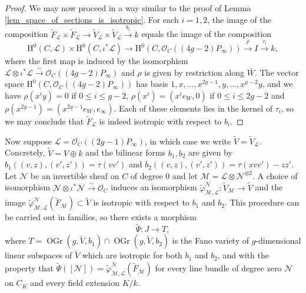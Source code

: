\documentclass{article} %
\numberwithin{equation}{section}
\newcommand{\sh}[1]{\mathscr{#1}}
\renewcommand{\O}{\mathcal{O}}
\newcommand{\HH}{\mathrm{H}}
\DeclareMathOperator{\OGr}{OGr}
\begin{document}
\begin{proof}
    We may now proceed in a way similar to the proof of Lemma \ref{lem_space_of_sections_is_isotropic}.
    For each $i=1,2$, the image of the composition $\tilde{F}_{\sh{L}} \times \tilde{F}_{\sh{L}} \rightarrow \tilde{V}_{\sh{L}} \times \tilde{V}_{\sh{L}} \xrightarrow{b_i} k$ equals the image of the composition 
    \[
    \HH^0(C, \sh{L}) \times \HH^0(C, \iota^*\sh{L}) \rightarrow
    \HH^0(C, \O_C((4g-2)P_{\infty})) \xrightarrow{\rho} I \xrightarrow{\tau_i} k,
    \]
    where the first map is induced by the isomorphism $\sh{L} \otimes \iota^*\sh{L} \xrightarrow{\sim} \O_C((4g-2)P_{\infty})$ and $\rho$ is given by restriction along $\bar{W}$.
    The vector space $\HH^0(C, \O_C((4g-2)P_{\infty}))$ has basis $1, x, \dots, x^{2g-1}, y, \dots, x^{g-2}y$, and we have $\rho(x^i y) = 0$ if $0\leq i\leq g-2$, $\rho(x^i) = (x^ie_W, 0)$ if $0\leq i \leq 2g-2$ and $\rho(x^{2g-1}) = (x^{2g-1}e_W,e_{\infty})$.
    Each of these elements lies in the kernel of $\tau_i$,  so we may conclude that  $\tilde{F}_{\sh{L}}$ is indeed isotropic with respect to $b_i$.
\end{proof}


Now suppose $\sh{L} = \O_{C}((2g-1)P_{\infty})$, in which case we write $\tilde{V} = \tilde{V}_{\sh{L}}$.
Concretely, $\tilde{V} = V \oplus k$ and the bilinear forms $b_1, b_2$ are given by $b_1((v,z), (v',z')) = \tau(vv')$ and $b_2((v,z), (v',z')) = \tau(xvv') -zz'$.
Let $\sh{N}$ be an invertible sheaf on $C$ of degree $0$ and let $\sh{M} = \sh{L} \otimes \sh{N}^{\otimes 2}$.
A choice of isomorphism $\sh{N} \otimes \iota^*\sh{N} \xrightarrow{\sim} \O_C$ induces an isomorphism $\tilde{\varphi}_{\sh{M}, \sh{L}}^{\sh{N}}\colon \tilde{V}_{\sh{M}} \rightarrow \tilde{V}$ and the image $\tilde{\varphi}_{\sh{M}, \sh{L}}^{\sh{N}}(\tilde{F}_{\sh{M}}) \subset \tilde{V}$ is isotropic with respect to $b_1$ and $b_2$.
This procedure can be carried out in families, so there exists a morphism 
\[
\tilde{\Psi}\colon J\rightarrow T,
\]
where $T = \OGr(g,\tilde{V},b_1) \cap \OGr(g, \tilde{V},b_2)$ is the Fano variety of $g$-dimensional linear subspaces of $\tilde{V}$ which are isotropic for both $b_1$ and $b_2$, and with the property that $\tilde{\Psi}([\sh{N}]) = \tilde{\varphi}_{\sh{M}, \sh{L}}^{\sh{N}}(\tilde{F}_{\sh{M}})$ for every line bundle of degree zero $\sh{N}$ on $C_K$ and every field extension $K/k$.
\end{document}
